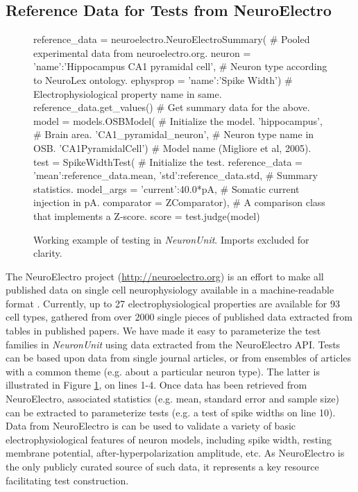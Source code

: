 \documentclass{frontiersSCNS}
\begin{document}
\subsection{Reference Data for Tests from NeuroElectro}\label{sec:neuroelectro} 
\begin{figure}
\begin{python}
reference_data = neuroelectro.NeuroElectroSummary( # Pooled experimental data from  neuroelectro.org. 
  neuron = {'name':'Hippocampus CA1 pyramidal cell'}, # Neuron type according to NeuroLex ontology.  
  ephysprop = {'name':'Spike Width'}) # Electrophysiological property name in same.
reference_data.get_values()  # Get summary data for the above. 
model = models.OSBModel( # Initialize the model.
        'hippocampus', # Brain area.  
        'CA1_pyramidal_neuron', # Neuron type name in OSB.  
        'CA1PyramidalCell') # Model name (Migliore et al, 2005).
test = SpikeWidthTest( # Initialize the test.    
	reference_data = {'mean':reference_data.mean, 'std':reference_data.std}, # Summary statistics.
	model_args = {'current':40.0*pA}, # Somatic current injection in pA.  
	comparator = ZComparator), # A comparison class that implements a Z-score.  
score = test.judge(model)
\end{python}
\vspace{-15px}
\caption{Working example of testing in \textit{NeuronUnit}. Imports excluded for clarity.}
\label{fig:neuronunit_example}

\end{figure}
The NeuroElectro project (\url{http://neuroelectro.org}) is an effort to make all published data on single cell neurophysiology available in a machine-readable format \citep{tripathy_neuroelectro:_2012}.  
Currently, up to 27 electrophysiological properties are available for 93 cell types, gathered from over 2000 single pieces of published data extracted from tables in published papers. 
We have made it easy to parameterize the test families in \textit{Neuron\-Unit}  using data extracted from the NeuroElectro API. 
Tests can be based upon data from single journal articles, or from ensembles of articles with a common theme (e.g. about a particular neuron type). 
The latter is illustrated in Figure \ref{fig:neuronunit_example}, on lines 1-4. Once data has been retrieved from NeuroElectro, associated statistics (e.g. mean, standard error and sample size) can be extracted to parameterize tests (e.g. a test of spike widths on line 10). Data from NeuroElectro is can be used to validate a variety of basic electrophysiological features of neuron models, including spike width, resting membrane potential, after-hyperpolarization amplitude, etc. 
As NeuroElectro is the only publicly curated source of such data, it represents a key resource facilitating test construction.  
\end{document}
